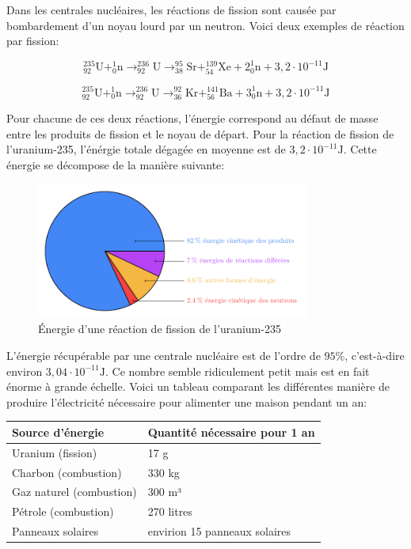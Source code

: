 \documentclass[
  letterpaper,
  DIV=11,
  numbers=noendperiod]{scrartcl}
\begin{document}
Dans les centrales nucléaires, les réactions de fission sont causée par
bombardement d'un noyau lourd par un neutron. Voici deux exemples de
réaction par fission:

\[
 ^{235}_{92}\text{U} + ^1_0\text{n} \rightarrow ^{236}_{92}\text{U}\rightarrow ^{95}_{38}\text{Sr} + ^{139}_54\text{Xe} + 2 ^1_0\text{n} + 3,2 \cdot 10^{-11}\text{J}
 \]

\[
 ^{235}_{92}\text{U} + ^1_0\text{n} \rightarrow ^{236}_{92}\text{U}\rightarrow ^{92}_{36}\text{Kr} + ^{141}_{56}\text{Ba} + 3 ^1_0\text{n} + 3,2 \cdot 10^{-11}\text{J}
 \]

Pour chacune de ces deux réactions, l'énergie correspond au défaut de
masse entre les produits de fission et le noyau de départ. Pour la
réaction de fission de l'uranium-235, l'énérgie totale dégagée en
moyenne est de \(3,2 \cdot 10^{-11}\text{J}\). Cette énergie se
décompose de la manière suivante:

\begin{figure}[H]

{\centering \includegraphics[width=0.8\textwidth,height=\textheight]{figures/ff/fig2.pdf}

}

\caption{Énergie d'une réaction de fission de l'uranium-235}

\end{figure}%

L'énergie récupérable par une centrale nucléaire est de l'ordre de
\(95\%\), c'est-à-dire environ \(3,04 \cdot 10^{-11}\text{J}\). Ce
nombre semble ridiculement petit mais est en fait énorme à grande
échelle. Voici un tableau comparant les différentes manière de produire
l'électricité nécessaire pour alimenter une maison pendant un an:

\begin{longtable}[]{@{}ll@{}}
\toprule\noalign{}
Source d'énergie & Quantité nécessaire pour 1 an \\
\midrule\noalign{}
\endhead
\bottomrule\noalign{}
\endlastfoot
Uranium (fission) & 17 g \\
Charbon (combustion) & 330 kg \\
Gaz naturel (combustion) & 300 m³ \\
Pétrole (combustion) & 270 litres \\
Panneaux solaires & envirion 15 panneaux solaires \\
\end{longtable}
\end{document}
